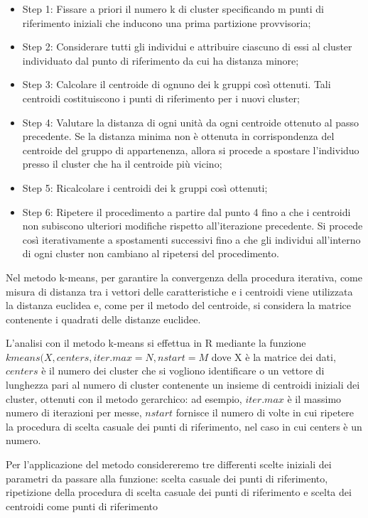 \begin{itemize}
    \item Step 1: Fissare a priori il numero k di cluster specificando m punti di riferimento iniziali che inducono una prima partizione provvisoria;
    \item Step 2: Considerare tutti gli individui e attribuire ciascuno di essi al cluster individuato dal punto di riferimento da cui ha distanza minore;
    \item Step 3: Calcolare il centroide di ognuno dei k gruppi così ottenuti. Tali centroidi costituiscono i punti di riferimento per i nuovi cluster;
    \item Step 4: Valutare la distanza di ogni unità da ogni centroide ottenuto al passo precedente. Se la distanza minima non è ottenuta in corrispondenza del centroide del gruppo di appartenenza, allora si procede a spostare l'individuo presso il cluster che ha il centroide più vicino;
    \item Step 5: Ricalcolare i centroidi dei k gruppi così ottenuti;
    \item Step 6: Ripetere il procedimento a partire dal punto 4 fino a che i centroidi non subiscono ulteriori modifiche rispetto all'iterazione precedente. Si procede così iterativamente a spostamenti successivi fino a che gli individui all'interno di ogni cluster non cambiano al ripetersi del procedimento.
\end{itemize}

Nel metodo k-means, per garantire la convergenza della procedura iterativa, come misura di distanza tra i vettori delle caratteristiche e i centroidi viene utilizzata la distanza euclidea e, come per il metodo del centroide, si considera la matrice contenente i quadrati delle distanze euclidee.

L'analisi con il metodo k-means si effettua in R mediante la funzione $kmeans(X, centers, iter.max = N, nstart = M$ dove X è la matrice dei dati, $centers$ è il numero dei cluster che si vogliono identificare o un vettore di lunghezza pari al numero di cluster contenente un insieme di centroidi iniziali dei cluster, ottenuti con il metodo gerarchico: ad esempio, $iter.max$ è il massimo numero di iterazioni per messe, $nstart$ fornisce il numero di volte in cui ripetere la procedura di scelta casuale dei punti di riferimento, nel caso in cui centers è un numero.

Per l'applicazione del metodo considereremo tre differenti scelte iniziali dei parametri da passare alla funzione: scelta casuale dei punti di riferimento, ripetizione della procedura di scelta casuale dei punti di riferimento e scelta dei centroidi come punti di riferimento

